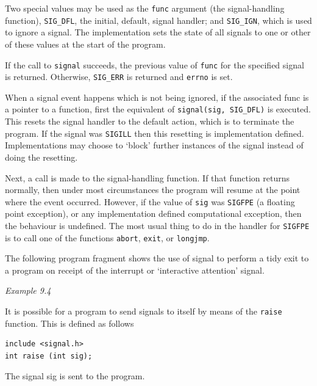   Two special values may be used as  the  \texttt{func}  argument  (the
   signal-handling  function),  \texttt{SIG\_DFL},  the initial, default,
   signal handler; and \texttt{SIG\_IGN},  which  is  used  to  ignore
   a signal.  The implementation sets the state of all signals to one or other
   of these values at the start of the program.


  If the call to \texttt{signal} succeeds, the previous value  of
   \texttt{func} for the specified signal is returned.  Otherwise,
   \texttt{SIG\_ERR} is returned and \texttt{errno} is set.


  When a signal event happens which is not being  ignored,  if the
   associated  func  is a pointer to a function, first the equivalent of
   \texttt{signal(sig, SIG\_DFL)} is executed. This  resets the  signal
   handler  to  the  default  action,  which is to terminate the program.  If
   the signal was \texttt{SIGILL}  then  this resetting  is  implementation
   defined.  Implementations may choose to `block' further instances of
   the signal instead of doing the resetting.


  Next, a call is made to the  signal-handling  function.   If that
   function   returns   normally,   then   under   most circumstances the
   program will resume at the point where the event  occurred.  However, if the
   value of \texttt{sig} was \texttt{SIGFPE} (a floating point
   exception),  or  any  implementation  defined computational  exception,
   then  the behaviour is undefined.  The most usual thing to do in the handler
   for \texttt{SIGFPE}  is  to call one of the functions
   \texttt{abort}, \texttt{exit}, or \texttt{longjmp}.


  The following program fragment shows the use  of  signal  to perform
   a tidy exit to a program on receipt of the interrupt or `interactive
   attention' signal.


  \begin{center}\textit{Example 9.4}\end{center}


  It is possible for a program to send signals  to  itself  by means of the
   \texttt{raise} function. This is defined as follows


  \begin{Verbatim}
include <signal.h>
int raise (int sig);
\end{Verbatim}

  The signal sig is sent to the program.


